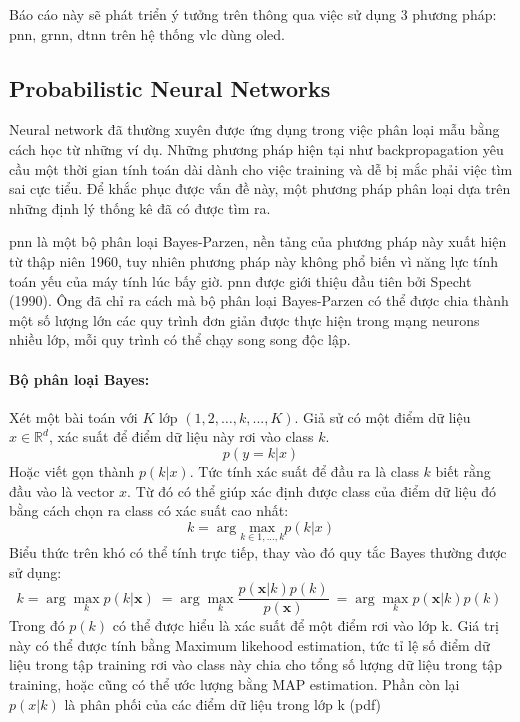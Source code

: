 Báo cáo này sẽ phát triển ý tưởng trên thông qua việc sử dụng 3 phương pháp: \ac{pnn}, \ac{grnn}, \ac{dtnn} trên hệ thống \ac{vlc} dùng \ac{oled}.
\subsection{Probabilistic Neural Networks}
Neural network đã thường xuyên được ứng dụng trong việc phân loại mẫu bằng cách học từ những ví dụ. Những phương pháp hiện tại như backpropagation yêu cầu một thời gian tính toán dài dành cho việc training và dễ bị mắc phải việc tìm sai cực tiểu. Để khắc phục được vấn đề này, một phương pháp phân loại dựa trên những định lý thống kê đã có được tìm ra. 

\ac{pnn} là một bộ phân loại Bayes-Parzen, nền tảng của phương pháp này xuất hiện từ thập niên 1960, tuy nhiên phương pháp này không phổ biến vì năng lực tính toán yếu của máy tính lúc bấy giờ. \ac{pnn} được giới thiệu đầu tiên bởi Specht (1990). Ông đã chỉ ra cách mà bộ phân loại Bayes-Parzen có thể được chia thành một số lượng lớn các quy trình đơn giản được thực hiện trong mạng neurons nhiều lớp, mỗi quy trình có thể chạy song song độc lập.
\paragraph{Bộ phân loại Bayes:} \cite{ml_coban}
Xét một bài toán với $K$ lớp $(1, 2, …, k, ..., K)$. Giả sử có một điểm dữ liệu $x \in \mathbb{R}^d$, xác suất để điểm dữ liệu này rơi vào class $k$.
\begin{equation}
p(y=k \vert x)
\end{equation}
Hoặc viết gọn thành $p(k|x)$.
Tức tính xác suất để đầu ra là class $k$ biết rằng đầu vào là vector $x$.
Từ đó có thể giúp xác định được class của điểm dữ liệu đó bằng cách chọn ra class có xác suất cao nhất: 
\begin{equation}
k = \arg \underset{k \in {{1, ..., k}}} {\mathrm{max}} p(k|x)
\end{equation}
Biểu thức trên khó có thể tính trực tiếp, thay vào đó quy tắc Bayes thường được sử dụng:
\begin{equation}
  k =  \arg\max_k p(k | \mathbf{x}) \ 
     =  \arg\max_k \frac{p(\mathbf{x} | k) p(k)}{p(\mathbf{x})} \ 
       =  \arg\max_k p(\mathbf{x} | k) p(k) \ 
\end{equation}
Trong đó $p(k)$ có thể được hiểu là xác suất để một điểm rơi vào lớp k. Giá trị này có thể được tính bằng Maximum likehood estimation, tức tỉ lệ số điểm dữ liệu trong tập training rơi vào class này chia cho tổng số lượng dữ liệu trong tập training, hoặc cũng có thể ước lượng bằng MAP estimation. Phần còn lại $p(x|k)$ là phân phối của các điểm dữ liệu trong lớp k (\ac{pdf}) 


